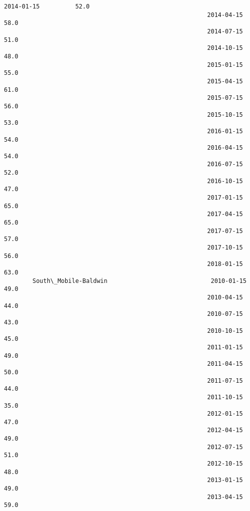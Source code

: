 \documentclass[11pt]{article}
\begin{document}
\begin{Verbatim}[commandchars=\\\{\}]
                                                         2014-01-15          52.0   
                                                         2014-04-15          58.0   
                                                         2014-07-15          51.0   
                                                         2014-10-15          48.0   
                                                         2015-01-15          55.0   
                                                         2015-04-15          61.0   
                                                         2015-07-15          56.0   
                                                         2015-10-15          53.0   
                                                         2016-01-15          54.0   
                                                         2016-04-15          54.0   
                                                         2016-07-15          52.0   
                                                         2016-10-15          47.0   
                                                         2017-01-15          65.0   
                                                         2017-04-15          65.0   
                                                         2017-07-15          57.0   
                                                         2017-10-15          56.0   
                                                         2018-01-15          63.0   
        South\_Mobile-Baldwin                             2010-01-15          49.0   
                                                         2010-04-15          44.0   
                                                         2010-07-15          43.0   
                                                         2010-10-15          45.0   
                                                         2011-01-15          49.0   
                                                         2011-04-15          50.0   
                                                         2011-07-15          44.0   
                                                         2011-10-15          35.0   
                                                         2012-01-15          47.0   
                                                         2012-04-15          49.0   
                                                         2012-07-15          51.0   
                                                         2012-10-15          48.0   
                                                         2013-01-15          49.0   
                                                         2013-04-15          59.0   

\end{Verbatim}
\end{document}
